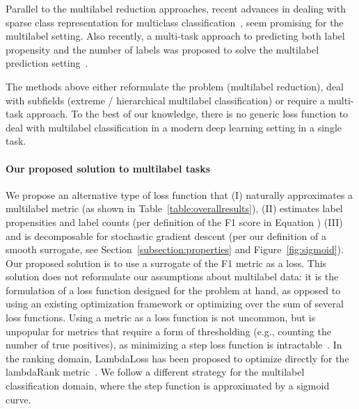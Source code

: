Parallel to the multilabel reduction approaches, recent advances in dealing with sparse class representation for multiclass classification~\citep{focalLoss,tencent}, seem promising for the multilabel setting. Also recently, a multi-task approach to predicting both label propensity and the number of labels was proposed to solve the multilabel prediction setting~\cite{multitaskLabel}.

The methods above either reformulate the problem (multilabel reduction), deal with subfields (extreme / hierarchical multilabel classification) or require a multi-task approach. To the best of our knowledge, there is no generic loss function to deal with multilabel classification in a modern deep learning setting in a single task.



\paragraph{Our proposed solution to multilabel tasks}
We propose an alternative type of loss function that (I) naturally approximates a multilabel metric (as shown in Table~\ref{table:overallresults}), (II) estimates label propensities and label counts (per definition of the F1 score in Equation ) (III) and is decomposable for stochastic gradient descent (per our definition of a smooth surrogate, see Section~\ref{subsection:properties} and Figure~\ref{fig:sigmoid}). Our proposed solution is to use a surrogate of the F1 metric as a loss. This solution does not reformulate our assumptions about multilabel data: it is the formulation of a loss function designed for the problem at hand, as opposed to using an existing optimization framework or optimizing over the sum of several loss functions.
Using a metric as a loss function is not uncommon, but is unpopular for metrics that require a form of thresholding (e.g., counting the number of true positives), as minimizing a step loss function is intractable~\cite{stochasticNegativeMining}. In the ranking domain, LambdaLoss has been proposed to optimize directly for the lambdaRank metric~\cite{lambdaLoss}. We follow a different strategy for the multilabel classification domain, where the step function is approximated by a sigmoid curve. 

